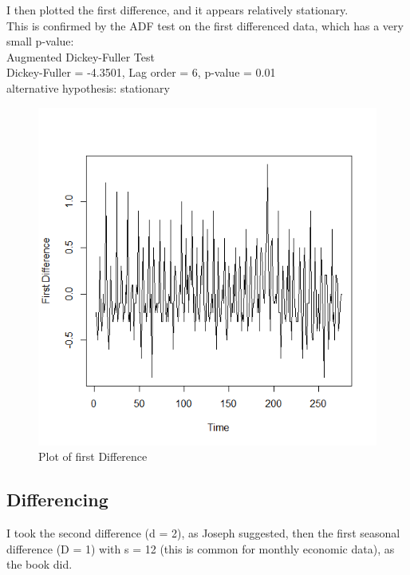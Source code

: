 {\begin{itemize}
			
			\begin{multicols}{2}
						I then plotted the first difference, and it appears relatively stationary.\\
						
							This is confirmed by the ADF test on the first differenced data, which has a very small p-value:\\
						
						Augmented Dickey-Fuller Test\\
						Dickey-Fuller = -4.3501, Lag order = 6, p-value = 0.01\\
						alternative hypothesis: stationary
						
						\begin{figure}[H]
							\centering
							\includegraphics[width=.6\linewidth]{images/firstdiff}
							\caption{Plot of first Difference}
							\label{fig:firstdiff}
						\end{figure}
			\end{multicols}
			


		\end{itemize}	}
	



  \subsection{Differencing}
  
      I took the second difference (d = 2), as Joseph suggested, then the first seasonal difference (D = 1) with s = 12 (this is common for monthly economic data), as the book did. \\
      
